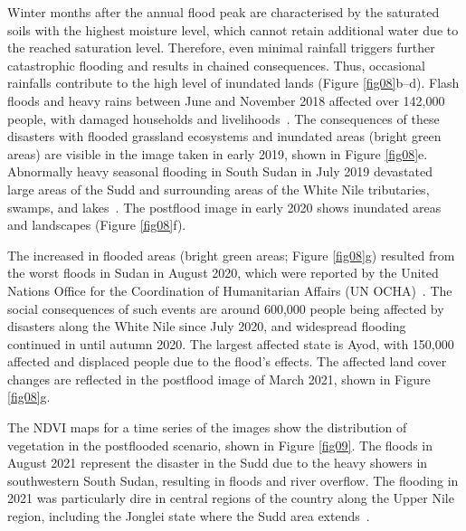 \documentclass[analytics,article,accept,pdftex,moreauthors]{Definitions/mdpi}
\begin{document}
Winter months after the annual flood peak are characterised by the saturated soils with the highest moisture level, which cannot retain additional water due to the reached saturation level. Therefore, even minimal rainfall triggers further catastrophic flooding and results in chained consequences. Thus, occasional rainfalls contribute to the high level of inundated lands (Figure \ref{fig08}b--d). Flash floods and heavy rains between June and November 2018 affected over 142,000 people, with damaged households and livelihoods~\cite{ReliefWeb2018}. The consequences of these disasters with flooded grassland ecosystems and inundated areas (bright green areas) are visible in the image taken in early 2019, shown in Figure \ref{fig08}e. Abnormally heavy seasonal flooding in South Sudan in July 2019 devastated large areas of the Sudd and surrounding areas of the White Nile tributaries, swamps, and lakes~\cite{OCHA2019}. The postflood image in early 2020 shows inundated areas and landscapes (Figure \ref{fig08}f).

The increased in flooded areas (bright green areas; Figure \ref{fig08}g) resulted from the worst floods in Sudan in August 2020, which were reported by the United Nations Office for the Coordination of Humanitarian Affairs (UN OCHA)~\cite{OCHA2020}. The social consequences of such events are around 600,000 people being affected by disasters along the White Nile since July 2020, and widespread flooding continued in until autumn 2020. The largest affected state is Ayod, with 150,000 affected and displaced people due to the flood's effects. The  affected land cover changes are reflected in the postflood image of March 2021, shown in Figure \ref{fig08}g. %

The NDVI maps for a time series of the images show the distribution of vegetation in the postflooded scenario, shown in Figure \ref{fig09}. The floods in August 2021 represent the disaster in the Sudd due to the heavy showers in southwestern South Sudan, resulting in floods and river overflow. The flooding in 2021 was particularly dire in central regions of the country along the Upper Nile region, including the Jonglei state where the Sudd area extends~\cite{SouthSudan2021}.  %
\end{document}
